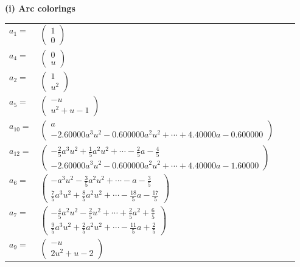 \documentclass[1p]{elsarticle_modified}
\theoremstyle{definition}
\begin{document}
\flushleft \textbf{(i) Arc colorings}\\
\begin{tabular}{m{7pt} m{180pt} m{7pt} m{180pt} }
\flushright $a_{1}=$&$\begin{pmatrix}1\\0\end{pmatrix}$ \\
\flushright $a_{4}=$&$\begin{pmatrix}0\\u\end{pmatrix}$ \\
\flushright $a_{2}=$&$\begin{pmatrix}1\\u^2\end{pmatrix}$ \\
\flushright $a_{5}=$&$\begin{pmatrix}- u\\u^2+u-1\end{pmatrix}$ \\
\flushright $a_{10}=$&$\begin{pmatrix}a\\-2.60000 a^{3} u^{2}-0.600000 a^{2} u^{2}+\cdots+4.40000 a-0.600000\end{pmatrix}$ \\
\flushright $a_{12}=$&$\begin{pmatrix}-\frac{2}{5} a^3 u^2+\frac{1}{5} a^2 u^2+\cdots-\frac{2}{5} a-\frac{4}{5}\\-2.60000 a^{3} u^{2}-0.600000 a^{2} u^{2}+\cdots+4.40000 a-1.60000\end{pmatrix}$ \\
\flushright $a_{6}=$&$\begin{pmatrix}- a^3 u^2-\frac{3}{5} a^2 u^2+\cdots- a-\frac{3}{5}\\\frac{7}{5} a^3 u^2+\frac{8}{5} a^2 u^2+\cdots-\frac{18}{5} a-\frac{17}{5}\end{pmatrix}$ \\
\flushright $a_{7}=$&$\begin{pmatrix}-\frac{4}{5} a^2 u^2-\frac{2}{5} u^2+\cdots+\frac{2}{5} a^2+\frac{6}{5}\\\frac{9}{5} a^3 u^2+\frac{2}{5} a^2 u^2+\cdots-\frac{11}{5} a+\frac{2}{5}\end{pmatrix}$ \\
\flushright $a_{9}=$&$\begin{pmatrix}- u\\2 u^2+u-2\end{pmatrix}$ \\

\end{tabular}
\end{document}
